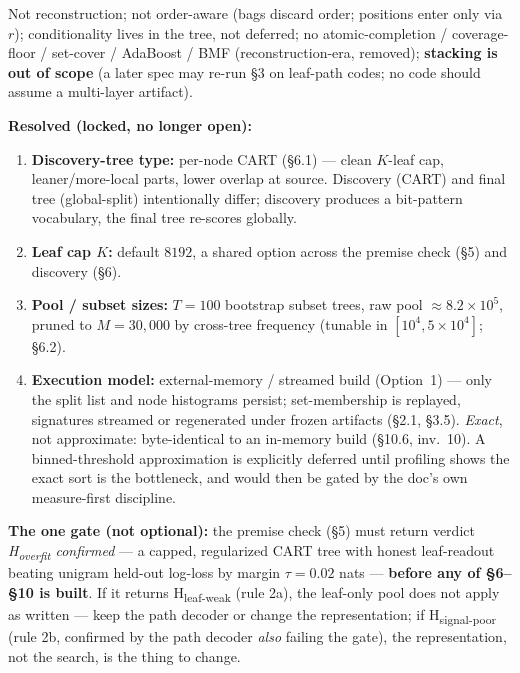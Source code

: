 \documentclass[11pt]{article}
\begin{document}
Not reconstruction; not order-aware (bags discard order; positions enter only via $r$); conditionality lives in the tree, not deferred; no atomic-completion / coverage-floor / set-cover / AdaBoost / BMF (reconstruction-era, removed); \textbf{stacking is out of scope} (a later spec may re-run \S3 on leaf-path codes; no code should assume a multi-layer artifact).





\textbf{Resolved (locked, no longer open):}
\begin{enumerate}[nosep]
\item \textbf{Discovery-tree type:} per-node CART (\S6.1) --- clean $K$-leaf cap, leaner/more-local parts, lower overlap at source. Discovery (CART) and final tree (global-split) intentionally differ; discovery produces a bit-pattern vocabulary, the final tree re-scores globally.
\item \textbf{Leaf cap $K$:} default $8192$, a shared option across the premise check (\S5) and discovery (\S6).
\item \textbf{Pool / subset sizes:} $T=100$ bootstrap subset trees, raw pool $\approx8.2\times10^5$, pruned to $M=30{,}000$ by cross-tree frequency (tunable in $[10^4,5\!\times\!10^4]$; \S6.2).
\item \textbf{Execution model:} external-memory / streamed build (Option~1) --- only the split list and node histograms persist; set-membership is replayed, signatures streamed or regenerated under frozen artifacts (\S2.1, \S3.5). \emph{Exact}, not approximate: byte-identical to an in-memory build (\S10.6, inv.~10). A binned-threshold approximation is explicitly deferred until profiling shows the exact sort is the bottleneck, and would then be gated by the doc's own measure-first discipline.
\end{enumerate}
\textbf{The one gate (not optional):} the premise check (\S5) must return verdict \emph{H\textsubscript{overfit} confirmed} --- a capped, regularized CART tree with honest leaf-readout beating unigram held-out log-loss by margin $\tau=0.02$ nats --- \textbf{before any of \S6--\S10 is built}. If it returns H\textsubscript{leaf-weak} (rule 2a), the leaf-only pool does not apply as written --- keep the path decoder or change the representation; if H\textsubscript{signal-poor} (rule 2b, confirmed by the path decoder \emph{also} failing the gate), the representation, not the search, is the thing to change.
\end{document}
